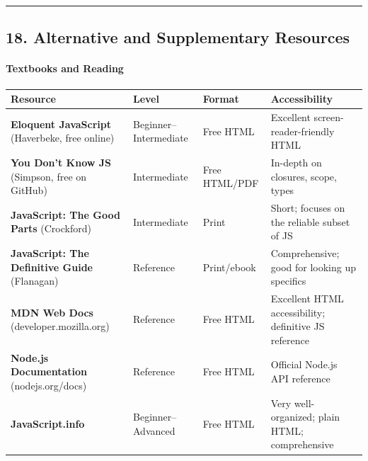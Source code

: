 \documentclass[
  justified,
  openright,
]{tufte-book}
\let\subsubsection\paragraph
\let\paragraph\paragraph
\let\subsubsection\paragraph
\let\paragraph\paragraph
\begin{document}
\begin{center}\rule{0.5\linewidth}{0.5pt}\end{center}

\subsection{18. Alternative and Supplementary
Resources}\label{alternative-and-supplementary-resources}

\subsubsection{Textbooks and Reading}\label{textbooks-and-reading}

{\def\LTcaptype{none} %
\begin{longtable}[]{@{}
  >{\raggedright\arraybackslash}p{}
  >{\raggedright\arraybackslash}p{}
  >{\raggedright\arraybackslash}p{}
  >{\raggedright\arraybackslash}p{}@{}}
\toprule\noalign{}
\begin{minipage}[b]{\linewidth}\raggedright
Resource
\end{minipage} & \begin{minipage}[b]{\linewidth}\raggedright
Level
\end{minipage} & \begin{minipage}[b]{\linewidth}\raggedright
Format
\end{minipage} & \begin{minipage}[b]{\linewidth}\raggedright
Accessibility
\end{minipage} \\
\midrule\noalign{}
\endhead
\bottomrule\noalign{}
\endlastfoot
\textbf{Eloquent JavaScript} (Haverbeke, free online) &
Beginner--Intermediate & Free HTML & Excellent screen-reader-friendly
HTML \\
\textbf{You Don't Know JS} (Simpson, free on GitHub) & Intermediate &
Free HTML/PDF & In-depth on closures, scope, types \\
\textbf{JavaScript: The Good Parts} (Crockford) & Intermediate & Print &
Short; focuses on the reliable subset of JS \\
\textbf{JavaScript: The Definitive Guide} (Flanagan) & Reference &
Print/ebook & Comprehensive; good for looking up specifics \\
\textbf{MDN Web Docs} (developer.mozilla.org) & Reference & Free HTML &
Excellent HTML accessibility; definitive JS reference \\
\textbf{Node.js Documentation} (nodejs.org/docs) & Reference & Free HTML
& Official Node.js API reference \\
\textbf{JavaScript.info} & Beginner--Advanced & Free HTML & Very
well-organized; plain HTML; comprehensive \\
\end{longtable}
}
\end{document}
